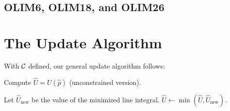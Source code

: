 \documentclass{article}
\begin{document}
\subsection{OLIM6, OLIM18, and OLIM26}

\section{The Update Algorithm}

With $\mathcal{C}$ defined, our general update algorithm follows:

\begin{algorithm}[H]
  \caption{Compute $\hat{U} = U(\hat{p})$ (unconstrained version).}
  \begin{algorithmic}
          \STATE{} Let $\hat{U}_{\operatorname{new}}$ be the value of the minimized line integral.
          \STATE{} $\hat{U} \gets \min(\hat{U}, \hat{U}_{\operatorname{new}})$.
        \ENDIF{}
      \ENDFOR{}
    \ENDFOR{}
  \end{algorithmic}
\end{algorithm}
\end{document}
